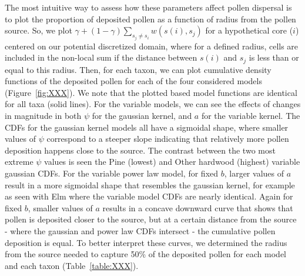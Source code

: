 \documentclass[12pt]{article}
\begin{document}
The most intuitive way to assess how these parameters affect pollen
dispersal is to plot the proportion of deposited pollen as a function
of radius from the pollen source. So, we plot $\gamma + (1- \gamma)
\sum_{s_j \neq s_i} w(s(i), s_j)$ for a hypothetical core ($i$)
centered on our potential discretized domain, where for a defined
radius, cells are included in the non-local sum if the distance
between $s(i)$ and $s_j$ is less than or equal to this radius. Then,
for each taxon, we can plot cumulative density functions of the
deposited pollen for each of the four considered models
(Figure~\ref{fig:XXX}). We note that the plotted based model functions
are identical for all taxa (solid lines).  For the variable models, we
can see the effects of changes in magnitude in both $\psi$ for the
gaussian kernel, and $a$ for the variable kernel. The CDFs for the
gaussian kernel models all have a sigmoidal shape, where smaller
values of $\psi$ correspond to a steeper slope indicating that
relatively more pollen deposition happens close to the source. The
contrast between the two most extreme $\psi$ values is seen the Pine
(lowest) and Other hardwood (highest) variable gaussian CDFs. For the
variable power law model, for fixed $b$, larger values of $a$ result
in a more sigmoidal shape that resembles the gaussian kernel, for
example as seen with Elm where the variable model CDFs are nearly
identical. Again for fixed $b$, smaller values of $a$ results in a
concave downward curve that shows that pollen is deposited closer to
the source, but at a certain distance from the source - where the
gaussian and power law CDFs intersect - the cumulative pollen
deposition is equal. To better interpret these curves, we determined
the radius from the source needed to capture 50\% of the deposited
pollen for each model and each taxon (Table~\ref{table:XXX}).





\end{document}
